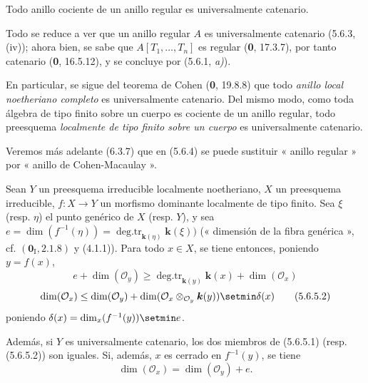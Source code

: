 \begin{proposition}[5.6.4]
\label{IV.2.s5.6.4-fr}
Todo anillo cociente de un anillo regular es universalmente catenario.
\end{proposition}

Todo se reduce a ver que un anillo regular $A$ es universalmente catenario
(5.6.3, (iv)); ahora bien, se sabe que $A[T_1,\ldots,T_n]$ es regular (\textbf 0, 17.3.7),
por tanto catenario (\textbf 0, 16.5.12), y se concluye por (5.6.1, \emph{a)}).

En particular, se sigue del teorema de Cohen (\textbf 0, 19.8.8) que todo \emph{anillo
local noetheriano completo} es universalmente catenario. Del mismo modo, como
toda álgebra de tipo finito sobre un cuerpo es cociente de un anillo regular,
todo preesquema \emph{localmente de tipo finito sobre un cuerpo} es universalmente
catenario.

Veremos más adelante (6.3.7) que en (5.6.4) se puede sustituir « anillo
regular » por « anillo de Cohen-Macaulay ».

\begin{proposition}[5.6.5]
Sean $Y$ un preesquema irreducible localmente noetheriano, $X$ un preesquema
irreducible, $f:X\to Y$ un morfismo dominante localmente de tipo finito. Sea
$\xi$ \textup{(resp. $\eta$)} el punto genérico de $X$ \textup{(resp. $Y$)}, y sea
$e=\dim(f^{-1}(\eta))=\operatorname{deg.tr}_{\mathbf{k}(\eta)}\boldsymbol{k}(\xi))$
\textup{(« dimensión de la fibra genérica », cf. $(\mathbf{0}_{\mathrm I},2.1.8)$ y
(4.1.1))}. Para todo $x\in X$, se tiene entonces, poniendo $y=f(x)$,
\begin{equation}
e+\dim(\mathcal O_y)
\geq\operatorname{deg.tr}_{\mathbf{k}(y)}\boldsymbol{k}(x)+\dim(\mathcal O_x)
\tag{5.6.5.1}\label{IV.2.s5.6.5.1-fr}
\end{equation}
\begin{equation}
\dim(\mathcal O_x)
\leq\dim(\mathcal O_y)
+\dim(\mathcal O_x\otimes_{\mathcal O_y}\boldsymbol{k}(y))\setmin\delta(x)
\tag{5.6.5.2}\label{IV.2.s5.6.5.2-fr}
\end{equation}
poniendo $\delta(x)=\dim_x(f^{-1}(y))\setmin e$.

Además, si $Y$ es universalmente catenario, los dos miembros de
\textup{(5.6.5.1) (resp. (5.6.5.2))} son iguales. Si, además, $x$ es cerrado en
$f^{-1}(y)$, se tiene
\begin{equation}
\dim(\mathcal O_x)=\dim(\mathcal O_y)+e.
\tag{5.6.5.3}\label{IV.2.s5.6.5.3-fr}
\end{equation}
\end{proposition}

